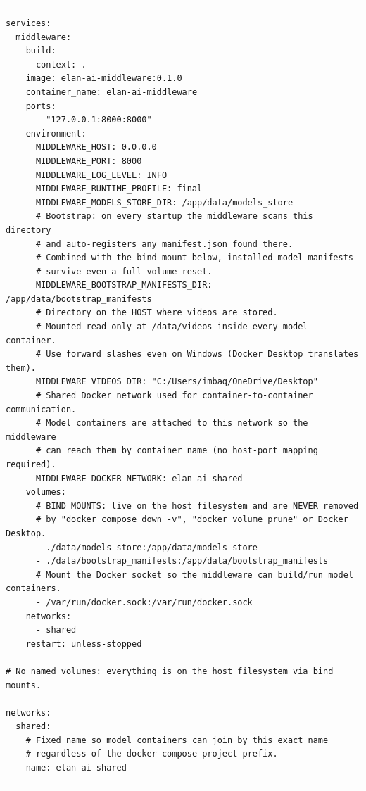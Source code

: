 \documentclass[11pt,a4paper]{article}
\begin{document}
\begin{center}
\begin{minipage}{0.96\textwidth}
\hrule
\vspace{0.06cm}
\scriptsize
\begin{Verbatim}[baselinestretch=0.68]
services:
  middleware:
    build:
      context: .
    image: elan-ai-middleware:0.1.0
    container_name: elan-ai-middleware
    ports:
      - "127.0.0.1:8000:8000"
    environment:
      MIDDLEWARE_HOST: 0.0.0.0
      MIDDLEWARE_PORT: 8000
      MIDDLEWARE_LOG_LEVEL: INFO
      MIDDLEWARE_RUNTIME_PROFILE: final
      MIDDLEWARE_MODELS_STORE_DIR: /app/data/models_store
      # Bootstrap: on every startup the middleware scans this directory
      # and auto-registers any manifest.json found there.
      # Combined with the bind mount below, installed model manifests
      # survive even a full volume reset.
      MIDDLEWARE_BOOTSTRAP_MANIFESTS_DIR: /app/data/bootstrap_manifests
      # Directory on the HOST where videos are stored.
      # Mounted read-only at /data/videos inside every model container.
      # Use forward slashes even on Windows (Docker Desktop translates them).
      MIDDLEWARE_VIDEOS_DIR: "C:/Users/imbaq/OneDrive/Desktop"
      # Shared Docker network used for container-to-container communication.
      # Model containers are attached to this network so the middleware
      # can reach them by container name (no host-port mapping required).
      MIDDLEWARE_DOCKER_NETWORK: elan-ai-shared
    volumes:
      # BIND MOUNTS: live on the host filesystem and are NEVER removed
      # by "docker compose down -v", "docker volume prune" or Docker Desktop.
      - ./data/models_store:/app/data/models_store
      - ./data/bootstrap_manifests:/app/data/bootstrap_manifests
      # Mount the Docker socket so the middleware can build/run model containers.
      - /var/run/docker.sock:/var/run/docker.sock
    networks:
      - shared
    restart: unless-stopped

# No named volumes: everything is on the host filesystem via bind mounts.

networks:
  shared:
    # Fixed name so model containers can join by this exact name
    # regardless of the docker-compose project prefix.
    name: elan-ai-shared
\end{Verbatim}
\vspace{0.03cm}
\hrule

\label{fig:docker_compose}
\end{minipage}
\end{center}
\end{document}
